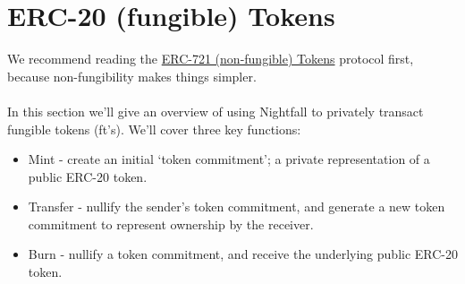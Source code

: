 \documentclass{article}
\begin{document}


\newpage


\newpage


\newpage


\newpage



\newpage
\section{ERC-20 (fungible) Tokens}
\label{sec:20}
\secttoc
\mtcskip
\sectlof

\noindent
We recommend reading the \hyperref[sec:721]{ERC-721 (non-fungible) Tokens} protocol first, because non-fungibility makes things simpler.\\
\\
In this section we'll give an overview of using Nightfall to privately transact fungible tokens (ft's). We'll cover three key functions:
\begin{itemize}
	\item Mint - create an initial `token commitment'; a private representation of a public ERC-20 token.
	\item Transfer - nullify the sender's token commitment, and generate a new token commitment to represent ownership by the receiver.
	\item Burn - nullify a token commitment, and receive the underlying public ERC-20 token.
\end{itemize}



\newpage


\newpage


\newpage


\newpage



\end{document}
